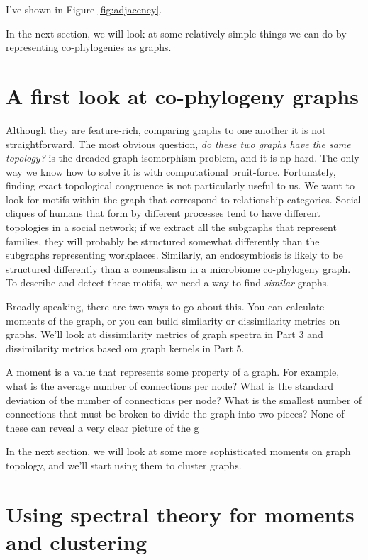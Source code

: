 \documentclass[
10pt, %
a4paper, %
oneside, %
headinclude,footinclude, %
BCOR5mm, %
]{scrartcl}
\begin{document}
I've shown in Figure \ref{fig:adjacency}.





In the next section, we will look at some relatively simple things we can do by representing co-phylogenies as graphs.

\section{A first look at co-phylogeny graphs}

Although they are feature-rich, comparing graphs to one another it is not straightforward. The most obvious question, {\em do these two graphs have the same topology?} is the dreaded graph isomorphism problem, and it is np-hard. The only way we know how to solve it is with computational bruit-force. Fortunately, finding exact topological congruence is not particularly useful to us. We want to look for motifs within the graph that correspond to relationship categories. Social cliques of humans that form by different processes tend to have different topologies in a social network; if we extract all the subgraphs that represent families, they will probably be structured somewhat differently than the subgraphs representing workplaces. Similarly, an endosymbiosis is likely to be structured differently than a comensalism in a microbiome co-phylogeny graph. To describe and detect these motifs, we need a way to find {\em similar} graphs.

Broadly speaking, there are two ways to go about this. You can calculate moments of the graph, or you can build similarity or dissimilarity metrics on graphs. We'll look at dissimilarity metrics of graph spectra in Part 3 and dissimilarity metrics based om graph kernels in Part 5. 

A moment is a value that represents some property of a graph. For example, what is the average number of connections per node? What is the standard deviation of the number of connections per node? What is the smallest number of connections that must be broken to divide the graph into two pieces? None of these can reveal a very clear picture of the g

In the next section, we will look at some more sophisticated moments on graph topology, and we'll start using them to cluster graphs.

\section{Using spectral theory for moments and clustering}
\end{document}
